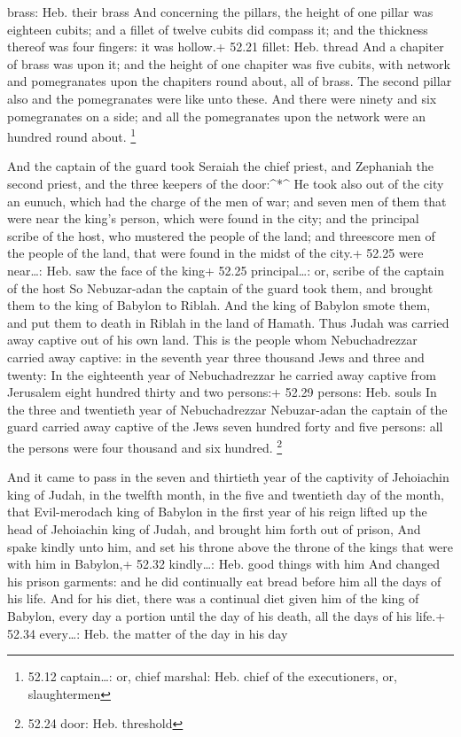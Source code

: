 brass: Heb. their brass  And concerning the pillars, the
height of one pillar was eighteen cubits; and a fillet of twelve cubits
did compass it; and the thickness thereof was four fingers: it was
hollow.+ 52.21 fillet: Heb. thread  And a chapiter of brass
was upon it; and the height of one chapiter was five cubits, with
network and pomegranates upon the chapiters round about, all of brass.
The second pillar also and the pomegranates were like unto these.
 And there were ninety and six pomegranates on a side; and
all the pomegranates upon the network were an hundred round about.
\footnote{52.12 captain\ldots: or, chief marshal: Heb. chief of the
  executioners, or, slaughtermen}

 And the captain of the guard took Seraiah the chief
priest, and Zephaniah the second priest, and the three keepers of the
door:\^{}*\^{}  He took also out of the city an eunuch,
which had the charge of the men of war; and seven men of them that were
near the king's person, which were found in the city; and the principal
scribe of the host, who mustered the people of the land; and threescore
men of the people of the land, that were found in the midst of the
city.+ 52.25 were near\ldots: Heb. saw the face of the king+ 52.25
principal\ldots: or, scribe of the captain of the host  So
Nebuzar-adan the captain of the guard took them, and brought them to the
king of Babylon to Riblah.  And the king of Babylon smote
them, and put them to death in Riblah in the land of Hamath. Thus Judah
was carried away captive out of his own land.  This is the
people whom Nebuchadrezzar carried away captive: in the seventh year
three thousand Jews and three and twenty:  In the
eighteenth year of Nebuchadrezzar he carried away captive from Jerusalem
eight hundred thirty and two persons:+ 52.29 persons: Heb. souls
 In the three and twentieth year of Nebuchadrezzar
Nebuzar-adan the captain of the guard carried away captive of the Jews
seven hundred forty and five persons: all the persons were four thousand
and six hundred. \footnote{52.24 door: Heb. threshold}

 And it came to pass in the seven and thirtieth year of the
captivity of Jehoiachin king of Judah, in the twelfth month, in the five
and twentieth day of the month, that Evil-merodach king of Babylon in
the first year of his reign lifted up the head of Jehoiachin king of
Judah, and brought him forth out of prison,  And spake
kindly unto him, and set his throne above the throne of the kings that
were with him in Babylon,+ 52.32 kindly\ldots: Heb. good things with him
 And changed his prison garments: and he did continually
eat bread before him all the days of his life.  And for his
diet, there was a continual diet given him of the king of Babylon, every
day a portion until the day of his death, all the days of his life.+
52.34 every\ldots: Heb. the matter of the day in his day
